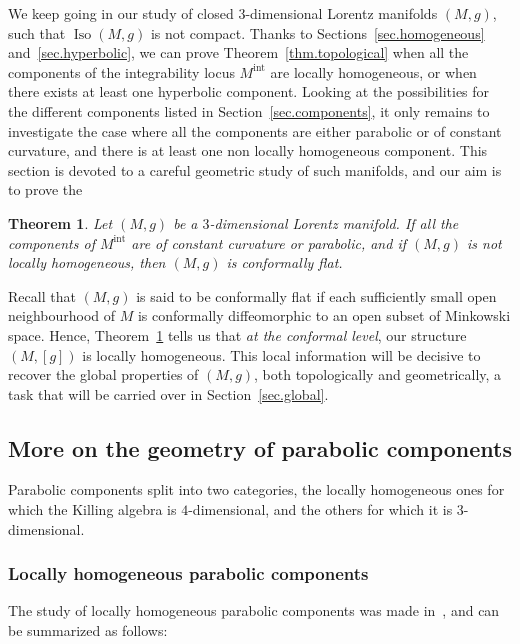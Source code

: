 \documentclass[11pt]{article}
\newtheorem{theo}{Theorem}[section]
\theoremstyle{definition}
\numberwithin{equation}{section}
\numberwithin{figure}{section}
\numberwithin{table}{section}
\DeclareMathOperator{\Iso}{Iso}
\newcommand{\mint}{{M^{\intl}}}
\DeclareMathOperator{\intl}{int}
\begin{document}
We keep going in our study of closed $3$-dimensional Lorentz manifolds $(M,g)$, such that $\Iso(M,g)$ is not compact. Thanks to Sections~\ref{sec.homogeneous} and~\ref{sec.hyperbolic}, we can prove Theorem~\ref{thm.topological} when all the components of the integrability locus $\mint$ are locally homogeneous, or when there exists at least one hyperbolic component. Looking at the possibilities for the different components listed in Section~\ref{sec.components}, it only remains to investigate the case where all the components are either parabolic or of constant curvature, and there is at least one non locally homogeneous component. This section is devoted to a careful geometric study of such manifolds, and our aim is to prove the


\begin{theo}\label{thm.conf.flat}
Let $(M,g)$ be a $3$-dimensional Lorentz manifold. If all the components of $\mint$ are of constant curvature or parabolic, and if $(M,g)$ is not locally homogeneous, then $(M,g)$ is conformally flat.
\end{theo}


Recall that $(M,g)$ is said to be conformally flat if each sufficiently small open neighbourhood of $M$ is conformally diffeomorphic to an open subset of Minkowski space. Hence, Theorem~\ref{thm.conf.flat} tells us that \emph{at the conformal level}, our structure $(M,[g])$ is locally homogeneous. This local information will be decisive to recover the global properties of $(M,g)$, both topologically and geometrically, a task that will be carried over in Section~\ref{sec.global}.



\subsection{More on the geometry of parabolic components}
Parabolic components split into two categories, the locally homogeneous ones for which the Killing algebra is $4$-dimensional, and the others for which it is $3$-dimensional.

\subsubsection{Locally homogeneous parabolic components}\label{sec.lochomoparabolic}
The study of locally homogeneous parabolic components was made in~\cite{frances.open}, and can be summarized as follows:
\end{document}
